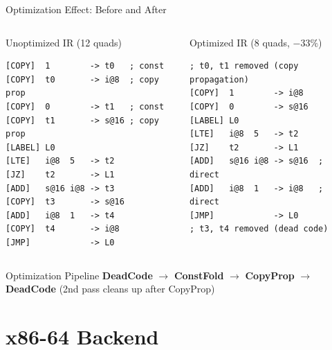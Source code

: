 \documentclass[aspectratio=169,11pt]{beamer}
\begin{document}
\begin{frame}[fragile]{Optimization Effect: Before and After}
\begin{columns}[t]
  \begin{alertblock}{Unoptimized IR (12 quads)}
\begin{lstlisting}[style=asmslide]
[COPY]  1        -> t0   ; const
[COPY]  t0       -> i@8  ; copy prop
[COPY]  0        -> t1   ; const
[COPY]  t1       -> s@16 ; copy prop
[LABEL] L0
[LTE]   i@8  5   -> t2
[JZ]    t2       -> L1
[ADD]   s@16 i@8 -> t3
[COPY]  t3       -> s@16
[ADD]   i@8  1   -> t4
[COPY]  t4       -> i@8
[JMP]            -> L0
\end{lstlisting}
  \end{alertblock}

  \begin{exampleblock}{Optimized IR (8 quads, $-33\%$)}
\begin{lstlisting}[style=asmslide]
; t0, t1 removed (copy propagation)
[COPY]  1        -> i@8
[COPY]  0        -> s@16
[LABEL] L0
[LTE]   i@8  5   -> t2
[JZ]    t2       -> L1
[ADD]   s@16 i@8 -> s@16  ; direct
[ADD]   i@8  1   -> i@8   ; direct
[JMP]            -> L0
; t3, t4 removed (dead code)
\end{lstlisting}
  \end{exampleblock}
\end{columns}

\vspace{0.2cm}
\begin{block}{\small Optimization Pipeline}
  \centering\small
  \textbf{DeadCode} $\to$ \textbf{ConstFold} $\to$ \textbf{CopyProp} $\to$ \textbf{DeadCode} (2nd pass cleans up after CopyProp)
\end{block}
\end{frame}

\section{x86-64 Backend}
\end{document}
